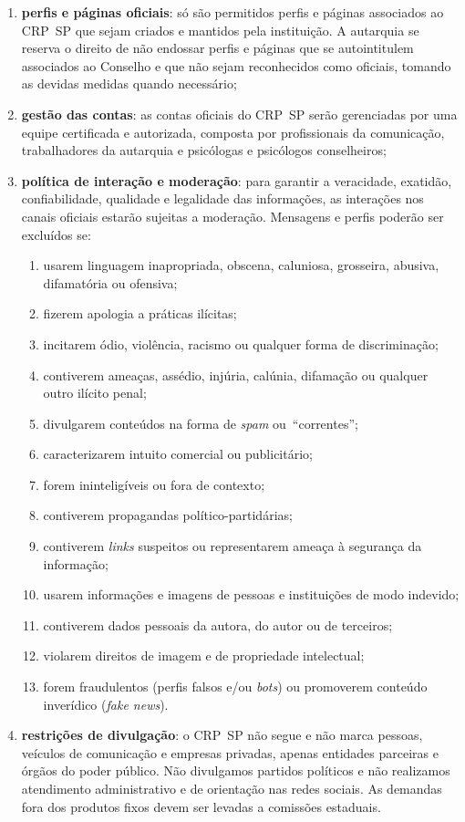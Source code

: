 \begin{enumerate}
	\def\labelenumi{\arabic{enumi}.}
	\item
	\textbf{perfis e páginas oficiais}: só são permitidos perfis e páginas
	associados ao CRP~SP que sejam criados e mantidos pela instituição. A
	autarquia se reserva o direito de não endossar perfis e páginas que se
	autointitulem associados ao Conselho e que não sejam reconhecidos como
	oficiais, tomando as devidas medidas quando necessário;
	\item
	\textbf{gestão das contas}: as contas oficiais do CRP~SP serão
	gerenciadas por uma equipe certificada e autorizada, composta por
	profissionais da comunicação, trabalhadores da autarquia e psicólogas
	e psicólogos conselheiros;
	\item
	\textbf{política de interação e moderação}: para garantir a
	veracidade, exatidão, confiabilidade, qualidade e legalidade das
	informações, as interações nos canais oficiais estarão sujeitas a
	moderação. Mensagens e perfis poderão ser excluídos se:

	\begin{enumerate}
		\def\labelenumii{\arabic{enumii}.}
		\item
		usarem linguagem inapropriada, obscena, caluniosa, grosseira,     abusiva, difamatória ou ofensiva;
		\item
		fizerem apologia a práticas ilícitas;
		\item
		incitarem ódio, violência, racismo ou qualquer forma de discriminação;
		\item
		contiverem ameaças, assédio, injúria, calúnia, difamação ou qualquer outro ilícito penal;
		\item
		divulgarem conteúdos na forma de \emph{spam} ou~``correntes'';
		\item
		caracterizarem intuito comercial ou publicitário;
		\item
		forem ininteligíveis ou fora de contexto;
		\item
		contiverem propagandas político-partidárias;
		\item
		contiverem \emph{links} suspeitos ou representarem ameaça à segurança da informação;
		\item
		usarem informações e imagens de pessoas e instituições de modo indevido;
		\item
		contiverem dados pessoais da autora, do autor ou de terceiros;
		\item
		violarem direitos de imagem e de propriedade intelectual;
		\item
		forem fraudulentos (perfis falsos e/ou \emph{bots}) ou promoverem conteúdo inverídico (\emph{fake news}).\\
	\end{enumerate}
	\item
	\textbf{restrições de divulgação}: o CRP~SP não segue e não marca pessoas, veículos de comunicação e empresas privadas, apenas entidades parceiras e órgãos do poder público. Não divulgamos partidos políticos e não realizamos atendimento administrativo e de orientação nas redes sociais. As demandas fora dos produtos fixos devem ser levadas a
	comissões estaduais.
\end{enumerate}

